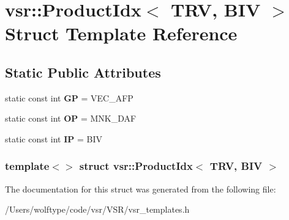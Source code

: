 \hypertarget{structvsr_1_1_product_idx_3_01_t_r_v_00_01_b_i_v_01_4}{\section{vsr\-:\-:Product\-Idx$<$ T\-R\-V, B\-I\-V $>$ Struct Template Reference}
\label{structvsr_1_1_product_idx_3_01_t_r_v_00_01_b_i_v_01_4}
}
\subsection*{Static Public Attributes}
\begin{DoxyCompactItemize}
\item 
\hypertarget{structvsr_1_1_product_idx_3_01_t_r_v_00_01_b_i_v_01_4_ae2860f83cc99cc29ca5d518bdfd7f380}{static const int {\bfseries G\-P} = V\-E\-C\-\_\-\-A\-F\-P}\label{structvsr_1_1_product_idx_3_01_t_r_v_00_01_b_i_v_01_4_ae2860f83cc99cc29ca5d518bdfd7f380}

\item 
\hypertarget{structvsr_1_1_product_idx_3_01_t_r_v_00_01_b_i_v_01_4_a205a84379e77140058e9487a6dbf0031}{static const int {\bfseries O\-P} = M\-N\-K\-\_\-\-D\-A\-F}\label{structvsr_1_1_product_idx_3_01_t_r_v_00_01_b_i_v_01_4_a205a84379e77140058e9487a6dbf0031}

\item 
\hypertarget{structvsr_1_1_product_idx_3_01_t_r_v_00_01_b_i_v_01_4_aff86a101c00558ab0fbfd8656c8d1ac0}{static const int {\bfseries I\-P} = B\-I\-V}\label{structvsr_1_1_product_idx_3_01_t_r_v_00_01_b_i_v_01_4_aff86a101c00558ab0fbfd8656c8d1ac0}

\end{DoxyCompactItemize}
\subsubsection*{template$<$$>$ struct vsr\-::\-Product\-Idx$<$ T\-R\-V, B\-I\-V $>$}



The documentation for this struct was generated from the following file\-:\begin{DoxyCompactItemize}
\item 
/\-Users/wolftype/code/vsr/\-V\-S\-R/vsr\-\_\-templates.\-h\end{DoxyCompactItemize}
